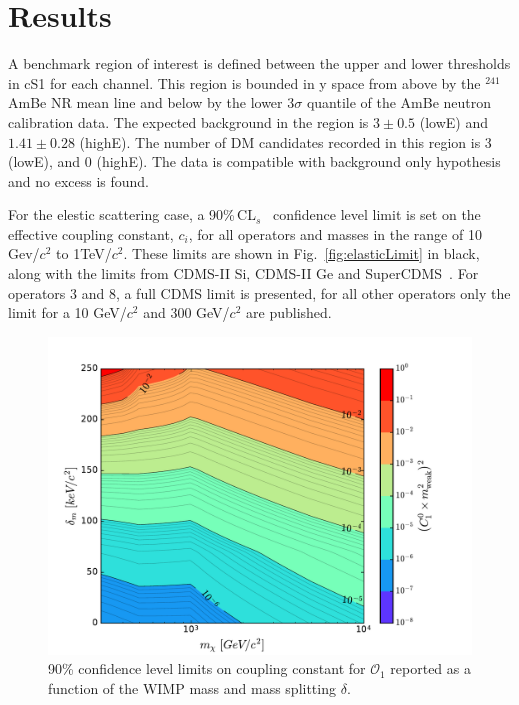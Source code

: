 \section{Results}

A benchmark region of interest is defined between the upper and lower thresholds in cS1 for each channel. This region
is bounded in y space from above by the $^{241}$AmBe NR mean line and below by the lower 3$\sigma$ quantile of the AmBe neutron calibration data. The expected background in the region is $3 \pm 0.5$ (lowE) and $1.41 \pm 0.28$ (highE). The number of DM candidates recorded in this region is 3 (lowE), and 0 (highE). The data is compatible with background only hypothesis and no excess is found. 

For the elestic scattering case, a 90\%\,CL$_s$~\cite{cls} confidence level limit is set on the  effective coupling constant, $c_i$,  for all operators and masses in the range of 10 Gev/$c^2$ to 1TeV/$c^2$. 
These limits are shown in Fig.~\ref{fig:elasticLimit} in black, along with the limits from CDMS-II Si, CDMS-II Ge and SuperCDMS~\cite{CDMSEFT}. For operators 3 and 8, a full CDMS limit is presented, for all other operators only the limit for a 10 GeV/$c^2$ and 300 GeV/$c^2$ are published.  

\begin{figure}[h!]
\centerline{\includegraphics[width=1.\linewidth]{Figures/O1_inelastic_lim_2D}}
\caption{90\% confidence level limits on coupling constant for $\mathcal{O}_1$ reported as a function of the WIMP mass and mass splitting $\delta$.}
\label{fig:O1Inel}
\end{figure}  

